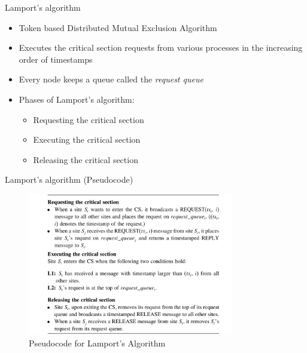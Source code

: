 \documentclass{beamer}
\begin{document}
	\begin{frame}{Lamport's algorithm}
		\begin{itemize}
			\item Token based Distributed Mutual Exclusion Algorithm
			\item Executes the critical section requests from various processes in the increasing order of timestamps
			\item Every node keeps a queue called the \textit{request queue}
			\item Phases of Lamport's algorithm:
			\begin{itemize}
				\item Requesting the critical section
				\item Executing the critical section
				\item Releasing the critical section
			\end{itemize}
		\end{itemize}
		
	\end{frame}
	
	\begin{frame}{Lamport's algorithm (Pseudocode)}
		\begin{figure}[H]
			\label{Lamportalgo}
			\includegraphics[width=90mm]{lamport_algo.png}
			\caption{Pseudocode for Lamport's Algorithm \cite{4}}
		\end{figure}
		
	\end{frame}
	
	
\end{document}
